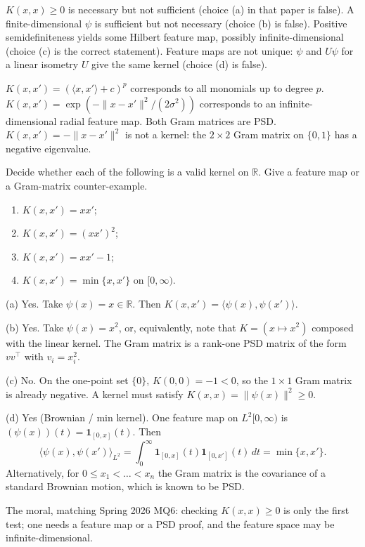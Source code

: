 \begin{remark}
\label{rem:mlu-kernel-mcq}
$K(x,x)\ge 0$ is necessary but not sufficient (choice (a) in that paper is false). A finite-dimensional $\psi$ is sufficient but not necessary (choice (b) is false). Positive semidefiniteness yields some Hilbert feature map, possibly infinite-dimensional (choice (c) is the correct statement). Feature maps are not unique: $\psi$ and $U\psi$ for a linear isometry $U$ give the same kernel (choice (d) is false).
\end{remark}

\begin{example}
$K(x,x')=(\langle x,x'\rangle+c)^p$ corresponds to all monomials up to degree $p$. $K(x,x')=\exp(-\lVert x-x'\rVert^2/(2\sigma^2))$ corresponds to an infinite-dimensional radial feature map. Both Gram matrices are PSD. $K(x,x')=-\lVert x-x'\rVert^2$ is not a kernel: the $2\times 2$ Gram matrix on $\{0,1\}$ has a negative eigenvalue.
\end{example}

\begin{exercise}
\label{ex:mlu-kernel-yesno}
Decide whether each of the following is a valid kernel on $\mathbb{R}$. Give a feature map or a Gram-matrix counter-example.
\begin{enumerate}[label=(\alph*)]
    \item $K(x,x')=xx'$;
    \item $K(x,x')=(xx')^2$;
    \item $K(x,x')=xx'-1$;
    \item $K(x,x')=\min\{x,x'\}$ on $[0,\infty)$.
\end{enumerate}
\end{exercise}

\begin{solution}
(a) Yes. Take $\psi(x)=x\in\mathbb{R}$. Then $K(x,x')=\langle\psi(x),\psi(x')\rangle$.

(b) Yes. Take $\psi(x)=x^2$, or, equivalently, note that $K=(x\mapsto x^2)$ composed with the linear kernel. The Gram matrix is a rank-one PSD matrix of the form $vv^\top$ with $v_i=x_i^2$.

(c) No. On the one-point set $\{0\}$, $K(0,0)=-1<0$, so the $1\times 1$ Gram matrix is already negative. A kernel must satisfy $K(x,x)=\lVert\psi(x)\rVert^2\ge 0$.

(d) Yes (Brownian / min kernel). One feature map on $L^2[0,\infty)$ is $(\psi(x))(t)=\mathbf{1}_{[0,x]}(t)$. Then
\[
\langle\psi(x),\psi(x')\rangle_{L^2}
=
\int_0^\infty\mathbf{1}_{[0,x]}(t)\mathbf{1}_{[0,x']}(t)\,dt
=
\min\{x,x'\}.
\]
Alternatively, for $0\le x_1<\dots<x_n$ the Gram matrix is the covariance of a standard Brownian motion, which is known to be PSD.

The moral, matching Spring 2026 MQ6: checking $K(x,x)\ge 0$ is only the first test; one needs a feature map or a PSD proof, and the feature space may be infinite-dimensional.
\end{solution}

